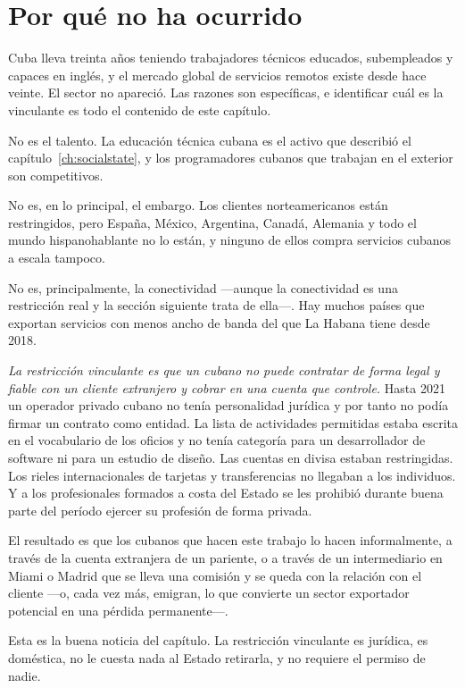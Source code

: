 \section{Por qué no ha ocurrido}

Cuba lleva treinta años teniendo trabajadores técnicos educados, subempleados y capaces en
inglés, y el mercado global de servicios remotos existe desde hace veinte. El sector no
apareció. Las razones son específicas, e identificar cuál es la vinculante es todo el
contenido de este capítulo.

No es el talento. La educación técnica cubana es el activo que describió el
capítulo~\ref{ch:socialstate}, y los programadores cubanos que trabajan en el exterior son
competitivos.

No es, en lo principal, el embargo. Los clientes norteamericanos están restringidos, pero
España, México, Argentina, Canadá, Alemania y todo el mundo hispanohablante no lo están, y
ninguno de ellos compra servicios cubanos a escala tampoco.

No es, principalmente, la conectividad ---aunque la conectividad es una restricción real y
la sección siguiente trata de ella---. Hay muchos países que exportan servicios con menos
ancho de banda del que La Habana tiene desde 2018.

\emph{La restricción vinculante es que un cubano no puede contratar de forma legal y
fiable con un cliente extranjero y cobrar en una cuenta que controle.} Hasta 2021 un
operador privado cubano no tenía personalidad jurídica y por tanto no podía firmar un
contrato como entidad. La lista de actividades permitidas estaba escrita en el vocabulario
de los oficios y no tenía categoría para un desarrollador de software ni para un estudio de
diseño. Las cuentas en divisa estaban restringidas. Los rieles internacionales de tarjetas
y transferencias no llegaban a los individuos. Y a los profesionales formados a costa del
Estado se les prohibió durante buena parte del período ejercer su profesión de forma
privada.

El resultado es que los cubanos que hacen este trabajo lo hacen informalmente, a través de
la cuenta extranjera de un pariente, o a través de un intermediario en Miami o Madrid que se
lleva una comisión y se queda con la relación con el cliente ---o, cada vez más, emigran, lo
que convierte un sector exportador potencial en una pérdida permanente---.

Esta es la buena noticia del capítulo. La restricción vinculante es jurídica, es doméstica,
no le cuesta nada al Estado retirarla, y no requiere el permiso de nadie.

